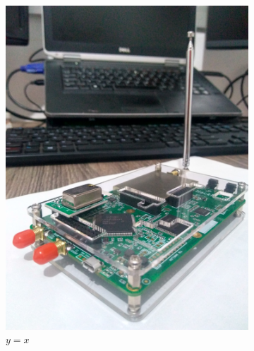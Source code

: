 \documentclass[
  12pt,				%
  openright,			%
  twoside,			%
  a4paper,			%
  english,			%
  french,				%
  spanish,			%
  brazil,				%
  ]{abntex2}
\begin{document}
\begin{figure}[!htb]
\begin{subfigure}[b]{0.45\linewidth}
    \includegraphics[width=\linewidth]{figures/hackrf/hack_rf.jpg}
    \caption{$y=x$}
    \label{fig:hack_rf}
  \end{subfigure}
  \hspace{0.5cm}
  \begin{subfigure}[b]{0.45\linewidth}
    \centering

\end{subfigure}
\end{figure}
\end{document}
